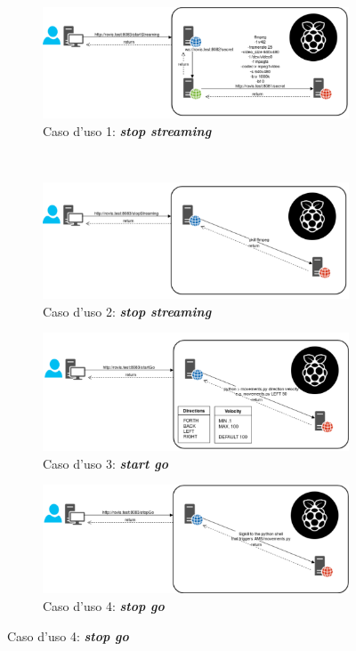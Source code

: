 \documentclass[11pt]{article}
\begin{document}
\begin{figure}[htp]
	\centering
	\begin{subfigure}[b]{0.6\textwidth}
		\includegraphics[width=\textwidth]{images/api1.png}
		\caption{Caso d'uso 1: \textbf{\textit{stop streaming}}}
		\label{fig:usecase1}
	\end{subfigure}
	\\
	\begin{subfigure}[b]{0.6\textwidth}	
		\includegraphics[width=\textwidth]{images/api2.png}
		\caption{Caso d'uso 2: \textbf{\textit{stop streaming}}}
		\label{fig:usecase2}
	\end{subfigure}
	\begin{subfigure}[b]{0.6\textwidth}
		\includegraphics[width=\textwidth]{images/api3.png}
		\caption{Caso d'uso 3: \textbf{\textit{start go}}}
		\label{fig:usecase3}
	\end{subfigure}
	\begin{subfigure}[b]{0.6\textwidth}
	
		\includegraphics[width=\textwidth]{images/api4.png}
		\caption{Caso d'uso 4: \textbf{\textit{stop go}}}
		\label{fig:usecase4}
	\end{subfigure}
\end{figure}
\end{document}
